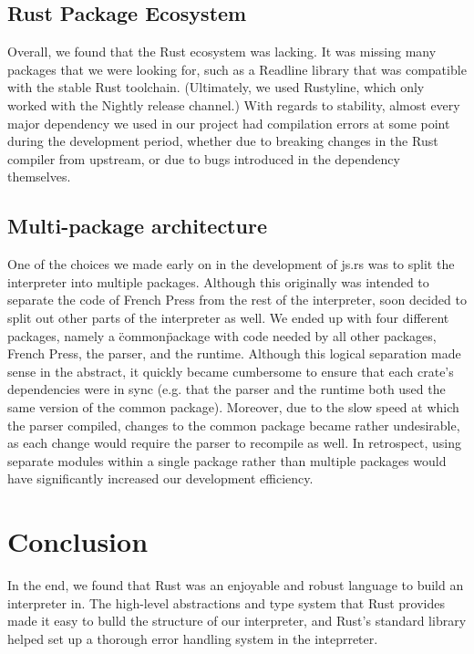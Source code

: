\documentclass{article}
\begin{document}
\begin{multicols}{2}
\subsection*{Rust Package Ecosystem}

Overall, we found that the Rust ecosystem was lacking. It was missing many
packages that we were looking for, such as a Readline library that was
compatible with the stable Rust toolchain. (Ultimately, we used
Rustyline\cite{rustyline}, which only worked with the Nightly release channel.)
With regards to stability, almost every major dependency we used in our project
had compilation errors at some point during the development period, whether due
to breaking changes in the Rust compiler from upstream, or due to bugs
introduced in the dependency themselves.

\subsection*{Multi-package architecture}

One of the choices we made early on in the development of js.rs was to split the
interpreter into multiple packages. Although this originally was intended to
separate the code of French Press from the rest of the interpreter, soon decided
to split out other parts of the interpreter as well. We ended up with four
different packages, namely a \"common\" package with code needed by all other
packages, French Press, the parser, and the runtime. Although this logical
separation made sense in the abstract, it quickly became cumbersome to ensure
that each crate's dependencies were in sync (e.g. that the parser and the
runtime both used the same version of the common package). Moreover, due to the
slow speed at which the parser compiled, changes to the common package became
rather undesirable, as each change would require the parser to recompile as
well. In retrospect, using separate modules within a single package rather than
multiple packages would have significantly increased our development efficiency.

\section{Conclusion}

In the end, we found that Rust was an enjoyable and robust language to build an
interpreter in. The high-level abstractions and type system that Rust provides
made it easy to bulld the structure of our interpreter, and Rust's standard
library helped set up a thorough error handling system in the inteprreter.
\newline


\end{multicols}
\end{document}
